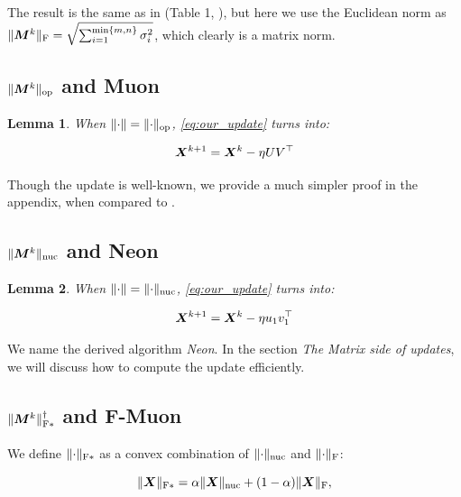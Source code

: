 \documentclass{article} %
\newtheorem{lemma}{Lemma}
\newcommand{\norm}[1]{\lVert #1\rVert}
\DeclarePairedDelimiter{\normf}{\|}{\|_\mathrm{F}}
\DeclarePairedDelimiter{\normfstar}{\|}{\|_\mathrm{F*}}
\DeclarePairedDelimiter{\norms}{\|}{\|_{\mathrm{op}}}
\DeclarePairedDelimiter{\normn}{\|}{\|_{\mathrm{nuc}}}
\begin{document}
        The result is the same as in (Table 1, \citet{pethick2025training}), but here we use the Euclidean norm as $\normf{\mM^k} = \sqrt{\sum_{i=1}^{\min\{m,n\}}\sigma_i^2}$, which clearly is a matrix norm.

    \subsection{\texorpdfstring{$\norms{\mM^{k}}$ and Muon}{Muon}}
    \begin{lemma}\label{lemma:muon_update}
        When $\norm{\cdot} = \norms{\cdot}$, \cref{eq:our_update} turns into:

        \begin{equation}\label{eq:muon_update}
            {\bm{X}}^{k+1} = {\bm{X}}^{k} - \eta U V^\top
        \end{equation}
    \end{lemma}

    Though the update is well-known, we provide a much simpler proof in the appendix, when compared to \citet{bernstein2024oldoptimizernewnorm}.

    \subsection{\texorpdfstring{$\normn{\mM^{k}}$ and Neon}{Neon}}
    \begin{lemma}\label{lemma:neon_update}
        When $\norm{\cdot} = \normn{\cdot}$, \cref{eq:our_update} turns into:

        \begin{equation}\label{eq:neon_update}
            {\bm{X}}^{k+1} = {\bm{X}}^{k} - \eta u_1 v_1^\top
        \end{equation}
    \end{lemma}
        We name the derived algorithm \emph{Neon}. In the section {\it The Matrix side of updates}, we will discuss how to compute the update efficiently.

    \subsection{\texorpdfstring{$\normfstar{\mM^{k}}^\dagger$ and F-Muon}{F-Muon}}
        We define $\normfstar{\cdot}$ as a convex combination of $\normn{\cdot}$ and $\normf{\cdot}$:

        \begin{equation}\label{eq:fstar_norm}
            \normfstar{\mX} = \alpha \normn{\mX} + (1-\alpha)\normf{\mX},
        \end{equation}
\end{document}
